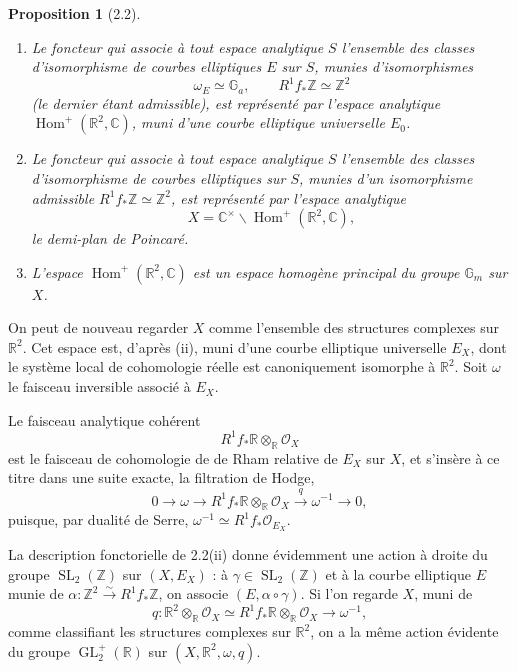 \documentclass[10pt]{article}
\newcommand{\C}{\mathbb C}
\newcommand{\R}{\mathbb R}
\newcommand{\Z}{\mathbb Z}
\newcommand{\Ga}{\mathbb G_a}
\newcommand{\Gm}{\mathbb G_m}
\newcommand{\GL}{\operatorname{GL}}
\newcommand{\SL}{\operatorname{SL}}
\newcommand{\Hom}{\operatorname{Hom}}
\newcommand{\cO}{\mathcal O}
\newtheorem*{proposition}{Proposition}
\begin{document}
\begin{proposition}[2.2]
\leavevmode
\begin{enumerate}[label=(\roman*)]
\item Le foncteur qui associe à tout espace analytique $S$ l'ensemble des classes
d'isomorphisme de courbes elliptiques $E$ sur $S$, munies d'isomorphismes
\[
\omega_E\simeq \Ga,\qquad R^1f_*\Z\simeq \Z^2
\]
(le dernier étant admissible), est représenté par l'espace analytique
$\Hom^+(\R^2,\C)$, muni d'une courbe elliptique universelle $E_0$.

\item Le foncteur qui associe à tout espace analytique $S$ l'ensemble des classes
d'isomorphisme de courbes elliptiques sur $S$, munies d'un isomorphisme admissible
$R^1f_*\Z\simeq \Z^2$, est représenté par l'espace analytique
\[
X=\C^\times\backslash\Hom^+(\R^2,\C),
\]
le demi-plan de Poincaré.

\item L'espace $\Hom^+(\R^2,\C)$ est un espace homogène principal du groupe $\Gm$ sur
$X$.
\end{enumerate}
\end{proposition}

On peut de nouveau regarder $X$ comme l'ensemble des structures complexes sur $\R^2$.
Cet espace est, d'après (ii), muni d'une courbe elliptique universelle $E_X$, dont le système
local de cohomologie réelle est canoniquement isomorphe à $\R^2$. Soit $\omega$ le
faisceau inversible associé à $E_X$.

Le faisceau analytique cohérent
\[
R^1f_*\R\otimes_\R\cO_X
\]
est le faisceau de cohomologie de de Rham relative de $E_X$ sur $X$, et s'insère à ce titre
dans une suite exacte, la filtration de Hodge,
\[
0\longrightarrow \omega\longrightarrow R^1f_*\R\otimes_\R\cO_X
\xrightarrow{q}\omega^{-1}\longrightarrow 0,
\]
puisque, par dualité de Serre, $\omega^{-1}\simeq R^1f_*\cO_{E_X}$.

La description fonctorielle de 2.2(ii) donne évidemment une action à droite du groupe
$\SL_2(\Z)$ sur $(X,E_X)$ : à $\gamma\in\SL_2(\Z)$ et à la courbe elliptique $E$ munie de
$\alpha:\Z^2\xrightarrow{\sim}R^1f_*\Z$, on associe $(E,\alpha\circ\gamma)$. Si l'on
regarde $X$, muni de
\[
q:\R^2\otimes_\R\cO_X\simeq R^1f_*\R\otimes_\R\cO_X\longrightarrow \omega^{-1},
\]
comme classifiant les structures complexes sur $\R^2$, on a la même action évidente du
groupe $\GL_2^+(\R)$ sur $(X,\R^2,\omega,q)$.
\end{document}
